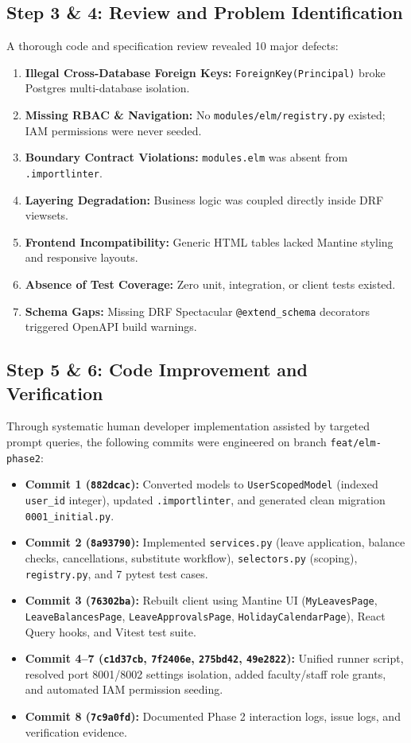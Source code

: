 \documentclass[11pt,a4paper]{article}
\begin{document}
\subsection{Step 3 \& 4: Review and Problem Identification}
A thorough code and specification review revealed 10 major defects:
\begin{enumerate}[noitemsep,topsep=2pt]
    \item \textbf{Illegal Cross-Database Foreign Keys:} \texttt{ForeignKey(Principal)} broke Postgres multi-database isolation.
    \item \textbf{Missing RBAC \& Navigation:} No \texttt{modules/elm/registry.py} existed; IAM permissions were never seeded.
    \item \textbf{Boundary Contract Violations:} \texttt{modules.elm} was absent from \texttt{.importlinter}.
    \item \textbf{Layering Degradation:} Business logic was coupled directly inside DRF viewsets.
    \item \textbf{Frontend Incompatibility:} Generic HTML tables lacked Mantine styling and responsive layouts.
    \item \textbf{Absence of Test Coverage:} Zero unit, integration, or client tests existed.
    \item \textbf{Schema Gaps:} Missing DRF Spectacular \texttt{@extend\_schema} decorators triggered OpenAPI build warnings.
\end{enumerate}

\subsection{Step 5 \& 6: Code Improvement and Verification}
Through systematic human developer implementation assisted by targeted prompt queries, the following commits were engineered on branch \texttt{feat/elm-phase2}:
\begin{itemize}[noitemsep,topsep=2pt]
    \item \textbf{Commit 1 (\texttt{882dcac}):} Converted models to \texttt{UserScopedModel} (indexed \texttt{user\_id} integer), updated \texttt{.importlinter}, and generated clean migration \texttt{0001\_initial.py}.
    \item \textbf{Commit 2 (\texttt{8a93790}):} Implemented \texttt{services.py} (leave application, balance checks, cancellations, substitute workflow), \texttt{selectors.py} (scoping), \texttt{registry.py}, and 7 pytest test cases.
    \item \textbf{Commit 3 (\texttt{76302ba}):} Rebuilt client using Mantine UI (\texttt{MyLeavesPage}, \texttt{LeaveBalancesPage}, \texttt{LeaveApprovalsPage}, \texttt{HolidayCalendarPage}), React Query hooks, and Vitest test suite.
    \item \textbf{Commit 4--7 (\texttt{c1d37cb}, \texttt{7f2406e}, \texttt{275bd42}, \texttt{49e2822}):} Unified runner script, resolved port 8001/8002 settings isolation, added faculty/staff role grants, and automated IAM permission seeding.
    \item \textbf{Commit 8 (\texttt{7c9a0fd}):} Documented Phase 2 interaction logs, issue logs, and verification evidence.
\end{itemize}
\end{document}
